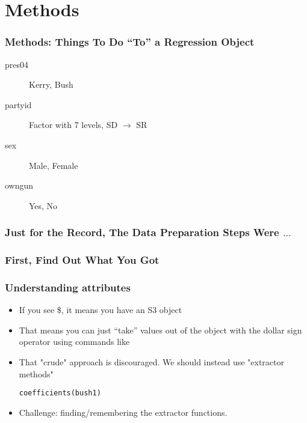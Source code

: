 \documentclass[10pt,english]{beamer}
\begin{document}

\section{Methods}
\begin{frame}[containsverbatim]
  \frametitle{Methods: Things To Do ``To'' a Regression Object}







\begin{description}
  \item [pres04] Kerry,  Bush
  \item [partyid]  Factor with 7 levels, SD $\rightarrow$ SR
  \item [sex]    Male, Female
  \item [owngun] Yes, No
\end{description}
\end{frame}

\begin{frame}[containsverbatim]
  \frametitle{Just for the Record, The Data Preparation Steps Were $\ldots$}


\end{frame}


\begin{frame}
  \frametitle{First, Find Out What You Got}




\end{frame}


\begin{frame}[containsverbatim]
  \frametitle{Understanding attributes}
  \begin{itemize}
  \item If  you see \$, it means you have an S3 object
  \item That means you can just ``take'' values out of the object with
    the dollar sign operator using commands like



\item That "crude" approach is discouraged. We should instead use
    "extractor methods"

    \texttt{coefficients(bush1)}

  \item Challenge: finding/remembering the extractor functions.
  \end{itemize}
\end{frame}
\end{document}

